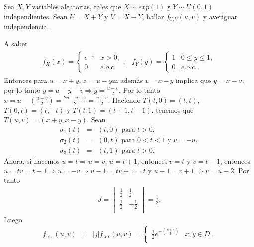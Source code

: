 \begin {Ejem}
Sea $X,Y$ variables aleatorias, tales que $X \sim exp \left( 1 \right)$ y $Y \sim U \left( 0,1 \right)$ independientes. Sean $U=X+Y$ y $V=X-Y$, hallar $f_{U,V} \left( u,v \right)$ y averiguar independencia.

A saber
\begin{eqnarray*}
\begin{array}{cc}
f_{X}\left( x \right)=
\begin{cases}
e^{-x} & x>0, \\ 
0 & e.o.c.
\end{cases},&
f_{Y}\left(y \right)=
\begin{cases}
1 & 0 \leq  y \leq 1, \\ 
0 & e.o.c.
\end{cases}
\end{array}
\end{eqnarray*}
Entonces para $u=x+y$, $x=u-y$m adem\'as $v=x-y$ implica  que $y=x-v$, por lo tanto $y=u-y-v \Rightarrow y= \frac{u-v}{2}$. Por lo tanto $x=u-\left(\frac{u-v}{2}\right)=\frac{2u-u+v}{2}=\frac{u+v}{2}$.
Haciendo $T \left(t,0 \right)=\left( t,t \right)$, $T \left(0,t \right)=\left( t,-t \right)$ y $T \left(t,1 \right)=\left( t+1,t-1 \right)$, tenemos que $T \left(u,v \right) = \left( x+y,x-y \right)$. Sean 
\begin{eqnarray*}
\sigma_{1} \left(t \right)&=&\left( t,0 \right)\textrm{ para }t>0, \\
\sigma_{2} \left(t \right)&=&\left( 0,t \right)\textrm{ para }0<t<1 \textrm{ y }v=-u, \\
\sigma_{3} \left(t \right)&=&\left( t,1 \right) \textrm{ para } t>0. 
\end{eqnarray*}
Ahora, si hacemos $u=t \Rightarrow u=v$, $u=t+1$, entonces $v=t$ y $v= t-1$, entonces
$u=t v=t-1 \Rightarrow u=-v \Rightarrow u-1=t v+1=t$ y $u-1=v+1 \Rightarrow v=u-2$. Por tanto
\begin{eqnarray*}
J=
\begin{vmatrix}
\frac{1}{2} & \frac{1}{2}\\
\frac{1}{2} & -\frac{1}{2}\\
\end{vmatrix}=\frac{1}{2}. 
\end{eqnarray*}
Luego
\begin{eqnarray*} 
f_{u,v} \left(u,v \right) &=& |j| f_{XY}\left( u,v \right)=
\begin{cases}
\frac{1}{2} e^{-\left(\frac{u+v}{2} \right)} & x,y\in D,\\

\end{cases}
\end{eqnarray*}
\end{Ejem}
